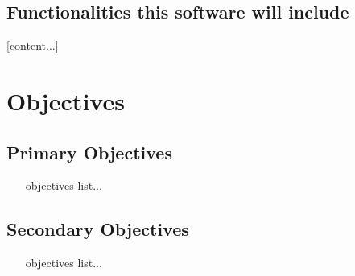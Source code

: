 \subsection{Functionalities this software will include}
[content...]

\section{Objectives}
\subsection{Primary Objectives}
\begin{itemize}
    \item [objectives list...]
\end{itemize}

\subsection{Secondary Objectives}
\begin{itemize}
    \item [objectives list...]
\end{itemize} 
